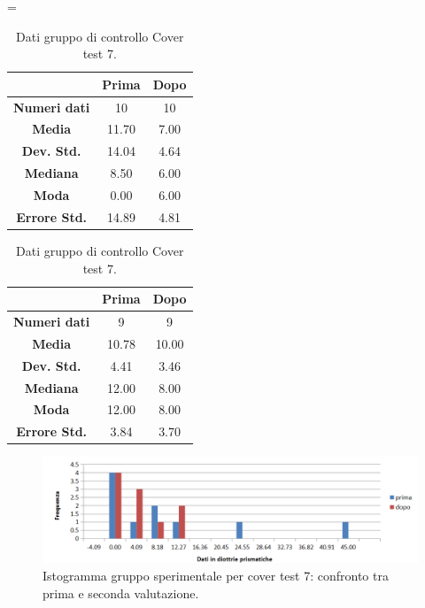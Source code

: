 \begin{table}
\centering
\setlength\tabcolsep{4pt}
\begin{minipage}{0.48\textwidth}
\centering
\tablewidth=\textwidth

\begin{tabular}{|c|c|c|} \hline
{\textbf{}} & {\textbf{  \hspace{8pt}Prima\hspace{8pt} }} & {\textbf{ \hspace{8pt}Dopo\hspace{8pt}  }}\\ \hline
\textbf{Numeri dati} & 10 & 10 \\ 
\textbf{Media} & 11.70 & 7.00 \\  
\textbf{Dev. Std.} & 14.04 & 4.64 \\  
\textbf{Mediana} & 8.50 & 6.00 \\ 
\textbf{Moda} & 0.00 & 6.00 \\ 
\textbf{Errore Std.} & 14.89 & 4.81 \\ 
\hline
\end{tabular}
\caption{Dati gruppo sperimentale Cover test 7.}

\label{tab:accuracy} 
\end{minipage}%
\hfill
\begin{minipage}{0.48\textwidth}
\centering

\begin{tabular}{|c|c|c|} \hline
{\textbf{}} & {\textbf{  \hspace{8pt}Prima\hspace{8pt} }} & {\textbf{ \hspace{8pt}Dopo\hspace{8pt}  }}\\ \hline
\textbf{Numeri dati} & 9 & 9 \\ 
\textbf{Media} & 10.78 & 10.00 \\  
\textbf{Dev. Std.} & 4.41 & 3.46 \\  
\textbf{Mediana} & 12.00 & 8.00 \\  
\textbf{Moda} & 12.00 & 8.00 \\
\textbf{Errore Std.} & 3.84 & 3.70 \\
\hline
\end{tabular}
\caption{Dati gruppo di controllo Cover test 7.}

 \label{tab:ompdiff} 
\end{minipage}
\end{table}
 \begin{figure}[h!]
	\centering
	\includegraphics[scale=0.38]{source/grafici/COVER_TEST_7_TRATTATI_NUOVO.png}
	\caption[Istogramma gruppo sperimentale per cover test 7]{Istogramma gruppo sperimentale per cover test 7: confronto tra prima e seconda valutazione.}
	\label{fig:issuexample}
\end{figure}
